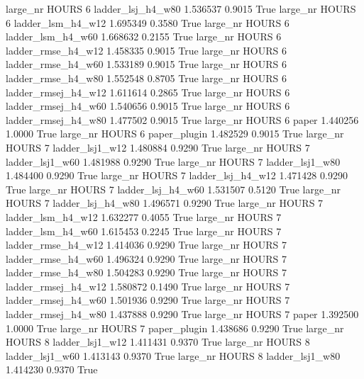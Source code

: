   large_nr    HOURS                 6   ladder_lsj_h4_w80   1.536537      0.9015    True
  large_nr    HOURS                 6   ladder_lsm_h4_w12   1.695349      0.3580    True
  large_nr    HOURS                 6   ladder_lsm_h4_w60   1.668632      0.2155    True
  large_nr    HOURS                 6  ladder_rmse_h4_w12   1.458335      0.9015    True
  large_nr    HOURS                 6  ladder_rmse_h4_w60   1.533189      0.9015    True
  large_nr    HOURS                 6  ladder_rmse_h4_w80   1.552548      0.8705    True
  large_nr    HOURS                 6 ladder_rmsej_h4_w12   1.611614      0.2865    True
  large_nr    HOURS                 6 ladder_rmsej_h4_w60   1.540656      0.9015    True
  large_nr    HOURS                 6 ladder_rmsej_h4_w80   1.477502      0.9015    True
  large_nr    HOURS                 6               paper   1.440256      1.0000    True
  large_nr    HOURS                 6        paper_plugin   1.482529      0.9015    True
  large_nr    HOURS                 7     ladder_lsj1_w12   1.480884      0.9290    True
  large_nr    HOURS                 7     ladder_lsj1_w60   1.481988      0.9290    True
  large_nr    HOURS                 7     ladder_lsj1_w80   1.484400      0.9290    True
  large_nr    HOURS                 7   ladder_lsj_h4_w12   1.471428      0.9290    True
  large_nr    HOURS                 7   ladder_lsj_h4_w60   1.531507      0.5120    True
  large_nr    HOURS                 7   ladder_lsj_h4_w80   1.496571      0.9290    True
  large_nr    HOURS                 7   ladder_lsm_h4_w12   1.632277      0.4055    True
  large_nr    HOURS                 7   ladder_lsm_h4_w60   1.615453      0.2245    True
  large_nr    HOURS                 7  ladder_rmse_h4_w12   1.414036      0.9290    True
  large_nr    HOURS                 7  ladder_rmse_h4_w60   1.496324      0.9290    True
  large_nr    HOURS                 7  ladder_rmse_h4_w80   1.504283      0.9290    True
  large_nr    HOURS                 7 ladder_rmsej_h4_w12   1.580872      0.1490    True
  large_nr    HOURS                 7 ladder_rmsej_h4_w60   1.501936      0.9290    True
  large_nr    HOURS                 7 ladder_rmsej_h4_w80   1.437888      0.9290    True
  large_nr    HOURS                 7               paper   1.392500      1.0000    True
  large_nr    HOURS                 7        paper_plugin   1.438686      0.9290    True
  large_nr    HOURS                 8     ladder_lsj1_w12   1.411431      0.9370    True
  large_nr    HOURS                 8     ladder_lsj1_w60   1.413143      0.9370    True
  large_nr    HOURS                 8     ladder_lsj1_w80   1.414230      0.9370    True
